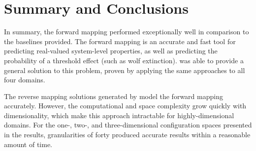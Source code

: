 \section{Summary and Conclusions}

In summary, the forward mapping performed exceptionally well in comparison to the baselines provided.
The forward mapping is an accurate and fast tool for predicting real-valued system-level properties, as well as predicting the probability of a threshold effect (such as wolf extinction).
\fw was able to provide a general solution to this problem, proven by applying the same approaches to all four domains.

The reverse mapping solutions generated by \fw model the forward mapping accurately.
However, the computational and space complexity grow quickly with dimensionality, which make this approach intractable for highly-dimensional domains.
For the one-, two-, and three-dimensional configuration spaces presented in the results, granularities of forty produced accurate results within a reasonable amount of time.



